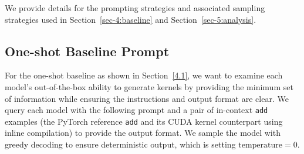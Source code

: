 We provide details for the prompting strategies and associated sampling strategies used in Section~\ref{sec-4:baseline} and Section~\ref{sec-5:analysis}. 

\subsection{One-shot Baseline Prompt}\label{appendix:one-shot-baseline-prompts}
For the one-shot baseline as shown in Section~\ref{4.1}, we want to examine each model's out-of-the-box ability to generate kernels by providing the minimum set of information while ensuring the instructions and output format are clear. We query each model with the following prompt and a pair of in-context \texttt{add} examples (the PyTorch reference \texttt{add} and its CUDA kernel counterpart using inline compilation) to provide the output format. We sample the model with greedy decoding to ensure deterministic output, which is setting $\text{temperature}=0$.  

